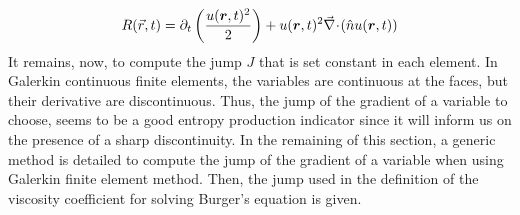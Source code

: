 %
\begin{equation}\label{eq:res_disc2_sct2}
R(\vec{r},t) = \partial_t \left( \frac{u(\boldsymbol r,t)^2}{2} \right) +  u(\boldsymbol r,t)^2 \vec{\nabla}\! \cdot \! \left( \hat{n} u(\boldsymbol r,t) \right)
\end{equation}
%
It remains, now, to compute the jump $J$ that is set constant in each element. In Galerkin continuous finite elements, the variables are continuous at the faces, but their derivative are discontinuous. Thus, the jump of the gradient of a variable to choose, seems to be a good entropy production indicator since it will inform us on the presence of a sharp discontinuity. In the remaining of this section, a generic method is detailed to compute the jump of the gradient of a variable when using Galerkin finite element method. Then, the jump used in the definition of the viscosity coefficient for solving Burger's equation is given. 


